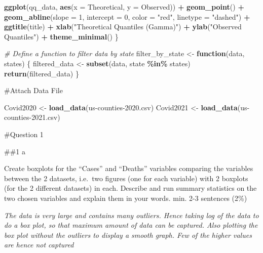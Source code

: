 \documentclass[
]{article}
\newenvironment{Shaded}{\begin{snugshade}}{\end{snugshade}}
\newcommand{\AttributeTok}[1]{\textcolor[rgb]{0.13,0.29,0.53}{#1}}
\newcommand{\CommentTok}[1]{\textcolor[rgb]{0.56,0.35,0.01}{\textit{#1}}}
\newcommand{\ControlFlowTok}[1]{\textcolor[rgb]{0.13,0.29,0.53}{\textbf{#1}}}
\newcommand{\DecValTok}[1]{\textcolor[rgb]{0.00,0.00,0.81}{#1}}
\newcommand{\FunctionTok}[1]{\textcolor[rgb]{0.13,0.29,0.53}{\textbf{#1}}}
\newcommand{\NormalTok}[1]{#1}
\newcommand{\OtherTok}[1]{\textcolor[rgb]{0.56,0.35,0.01}{#1}}
\newcommand{\SpecialCharTok}[1]{\textcolor[rgb]{0.81,0.36,0.00}{\textbf{#1}}}
\newcommand{\StringTok}[1]{\textcolor[rgb]{0.31,0.60,0.02}{#1}}
\begin{document}
\begin{Shaded}
\begin{Highlighting}[]
  \FunctionTok{ggplot}\NormalTok{(qq\_data, }\FunctionTok{aes}\NormalTok{(}\AttributeTok{x =}\NormalTok{ Theoretical, }\AttributeTok{y =}\NormalTok{ Observed)) }\SpecialCharTok{+}
    \FunctionTok{geom\_point}\NormalTok{() }\SpecialCharTok{+}
    \FunctionTok{geom\_abline}\NormalTok{(}\AttributeTok{slope =} \DecValTok{1}\NormalTok{, }\AttributeTok{intercept =} \DecValTok{0}\NormalTok{, }\AttributeTok{color =} \StringTok{"red"}\NormalTok{, }\AttributeTok{linetype =} \StringTok{"dashed"}\NormalTok{) }\SpecialCharTok{+}
    \FunctionTok{ggtitle}\NormalTok{(title) }\SpecialCharTok{+}
    \FunctionTok{xlab}\NormalTok{(}\StringTok{"Theoretical Quantiles (Gamma)"}\NormalTok{) }\SpecialCharTok{+}
    \FunctionTok{ylab}\NormalTok{(}\StringTok{"Observed Quantiles"}\NormalTok{) }\SpecialCharTok{+}
    \FunctionTok{theme\_minimal}\NormalTok{()}
\NormalTok{\}}

\CommentTok{\# Define a function to filter data by state}
\NormalTok{filter\_by\_state }\OtherTok{\textless{}{-}} \ControlFlowTok{function}\NormalTok{(data, states) \{}
\NormalTok{  filtered\_data }\OtherTok{\textless{}{-}} \FunctionTok{subset}\NormalTok{(data, state }\SpecialCharTok{\%in\%}\NormalTok{ states)}
  \FunctionTok{return}\NormalTok{(filtered\_data)}
\NormalTok{\}}
\end{Highlighting}
\end{Shaded}

\#Attach Data File

\begin{Shaded}
\begin{Highlighting}[]
\NormalTok{Covid2020 }\OtherTok{\textless{}{-}} \FunctionTok{load\_data}\NormalTok{(}\StringTok{\textquotesingle{}us{-}counties{-}2020.csv\textquotesingle{}}\NormalTok{)}
\NormalTok{Covid2021 }\OtherTok{\textless{}{-}} \FunctionTok{load\_data}\NormalTok{(}\StringTok{\textquotesingle{}us{-}counties{-}2021.csv\textquotesingle{}}\NormalTok{)}
\end{Highlighting}
\end{Shaded}

\#Question 1

\#\#1 a

Create boxplots for the ``Cases'' and ``Deaths'' variables comparing the
variables between the 2 datasets, i.e.~two figures (one for each
variable) with 2 boxplots (for the 2 different datasets) in each.
Describe and run summary statistics on the two chosen variables and
explain them in your words. min. 2-3 sentences (2\%)

\emph{The data is very large and contains many outliers. Hence taking
log of the data to do a box plot, so that maximum amount of data can be
captured. Also plotting the box plot without the outliers to display a
smooth graph. Few of the higher values are hence not captured}
\end{document}
